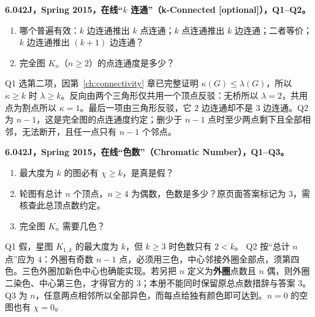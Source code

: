 \begin{exercise}
\textbf{6.042J，Spring 2015，在线“$k$ 连通”（k-Connected [optional]），Q1--Q2。}
\begin{enumerate}[label=Q\arabic*.]
\item\label{mit:6042-online-k-connected-q1} 哪个普遍有效：$k$ 边连通推出 $k$ 点连通；$k$ 点连通推出 $k$ 边连通；二者等价；$k$ 边连通推出 $(k+1)$ 边连通？
\item\label{mit:6042-online-k-connected-q2} 完全图 $K_n$（$n\ge2$）的点连通度是多少？
\end{enumerate}
\end{exercise}
\begin{solution}
Q1 选第二项，因第~\ref{ch:connectivity} 章已完整证明 $\kappa(G)\le\lambda(G)$，所以 $\kappa\ge k$ 时 $\lambda\ge k$。反向由两个三角形仅共用一个顶点反驳：无桥所以 $\lambda=2$，共用点为割点所以 $\kappa=1$。最后一项由三角形反驳，它 $2$ 边连通却不是 $3$ 边连通。Q2 为 $n-1$，这是完全图的点连通度约定；删少于 $n-1$ 点时至少两点剩下且全部相邻，无法断开，且任一点只有 $n-1$ 个邻点。
\end{solution}

\begin{exercise}
\textbf{6.042J，Spring 2015，在线“色数”（Chromatic Number），Q1--Q3。}
\begin{enumerate}[label=Q\arabic*.]
\item\label{mit:6042-online-chromatic-number-q1} 最大度为 $k$ 的图必有 $\chi\ge k$，是真是假？
\item\label{mit:6042-online-chromatic-number-q2} 轮图有总计 $n$ 个顶点，$n\ge4$ 为偶数，色数是多少？原页面答案标记为 $3$，需核查此总顶点数约定。
\item\label{mit:6042-online-chromatic-number-q3} 完全图 $K_n$ 需要几色？
\end{enumerate}
\end{exercise}
\begin{solution}
Q1 假，星图 $K_{1,k}$ 的最大度为 $k$，但 $k\ge3$ 时色数只有 $2<k$。
Q2 按“总计 $n$ 点”应为 $4$：外圈有奇数 $n-1$ 点，必须用三色，中心邻接外圈全部点，须第四色。三色外圈加新色中心也确能实现。若另把 $n$ 定义为\textbf{外圈}点数且 $n$ 偶，则外圈二染色、中心第三色，才得官方的 $3$；本册不能同时保留原总点数措辞与答案 $3$。
Q3 为 $n$，任意两点相邻所以全部异色，而每点给独有颜色即可达到。$n=0$ 的空图也有 $\chi=0$。
\end{solution}

